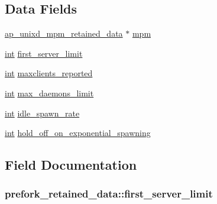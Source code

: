 \subsection*{Data Fields}
\begin{DoxyCompactItemize}
\item 
\hyperlink{structap__unixd__mpm__retained__data}{ap\+\_\+unixd\+\_\+mpm\+\_\+retained\+\_\+data} $\ast$ \hyperlink{structprefork__retained__data_ace750e67197f447ee3febfc90e0a0355}{mpm}
\item 
\hyperlink{pcre_8txt_a42dfa4ff673c82d8efe7144098fbc198}{int} \hyperlink{structprefork__retained__data_a679d3273f1595f6a9f57c66fad70e11a}{first\+\_\+server\+\_\+limit}
\item 
\hyperlink{pcre_8txt_a42dfa4ff673c82d8efe7144098fbc198}{int} \hyperlink{structprefork__retained__data_a3c021dad7b29d8614539721ad47a93f0}{maxclients\+\_\+reported}
\item 
\hyperlink{pcre_8txt_a42dfa4ff673c82d8efe7144098fbc198}{int} \hyperlink{structprefork__retained__data_ade20172b0ae9120dc5821f3d93dd4f25}{max\+\_\+daemons\+\_\+limit}
\item 
\hyperlink{pcre_8txt_a42dfa4ff673c82d8efe7144098fbc198}{int} \hyperlink{structprefork__retained__data_a3eddf9c6f8ec16adc5a0703658f78f9b}{idle\+\_\+spawn\+\_\+rate}
\item 
\hyperlink{pcre_8txt_a42dfa4ff673c82d8efe7144098fbc198}{int} \hyperlink{structprefork__retained__data_a53fe783ec5476ae6d72998d305b861b9}{hold\+\_\+off\+\_\+on\+\_\+exponential\+\_\+spawning}
\end{DoxyCompactItemize}


\subsection{Field Documentation}
\subsubsection[{\texorpdfstring{first\+\_\+server\+\_\+limit}{first_server_limit}}]{ prefork\+\_\+retained\+\_\+data\+::first\+\_\+server\+\_\+limit}\hypertarget{structprefork__retained__data_a679d3273f1595f6a9f57c66fad70e11a}{}\label{structprefork__retained__data_a679d3273f1595f6a9f57c66fad70e11a}
